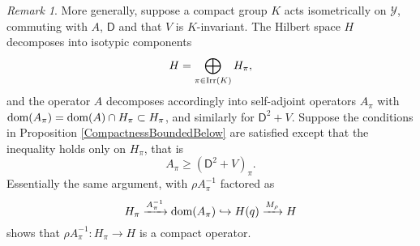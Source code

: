 \documentclass[11pt,reqno]{amsart}
\theoremstyle{definition}
\theoremstyle{remark}
\newtheorem{remark}[theorem]{Remark}
\newcommand{\st}[1]{\mathsf{#1}}
\newcommand{\tn}[1]{\textnormal{#1}}
\def\Y{\ensuremath{\mathcal{Y}}}
\def\dom{\ensuremath{\textnormal{dom}}}
\def\Irr{\ensuremath{\tn{Irr}}}
\begin{document}
\begin{remark}
\label{CompactIsotypicComponents}
More generally, suppose a compact group $K$ acts isometrically on $\Y$, commuting with $A$, $\st{D}$ and that $V$ is $K$-invariant.  The Hilbert space $H$ decomposes into isotypic components
\[ H=\bigoplus_{\pi \in \Irr(K)} H_\pi,\]
and the operator $A$ decomposes accordingly into self-adjoint operators $A_\pi$ with $\dom(A_\pi)=\dom(A)\cap H_\pi \subset H_\pi$, and similarly for $\st{D}^2+V$.  Suppose the conditions in Proposition \ref{CompactnessBoundedBelow} are satisfied except that the inequality holds only on $H_\pi$, that is
\[ A_\pi \ge (\st{D}^2+V)_\pi. \]
Essentially the same argument, with $\rho A_\pi^{-1}$ factored as
\[ H_\pi \xrightarrow{A_\pi^{-1}} \dom(A_\pi) \hookrightarrow 
H(q)\xrightarrow{M_\rho} H\]
shows that $\rho A_\pi^{-1}:H_\pi \rightarrow H$ is a compact operator.
\end{remark}

 

\end{document}
